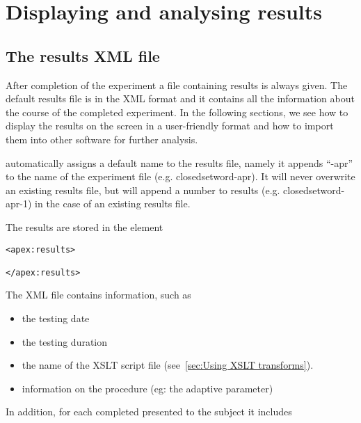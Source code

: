 \chapter{Displaying and analysing results}
\label{chap:Results}
\section{The results XML file}

After completion of the experiment a file containing results is
always given. The default results file is in the XML format and it
contains all the information about the course of the completed
experiment. In the following sections, we see how to display the
results on the screen in a user-friendly format and how to import
them into other software for further analysis.

\apex automatically assigns a default name to the results file,
namely it appends ``-apr'' to the name of the experiment file
(e.g. closedsetword-apr). It will never overwrite an existing
results file, but will append a number to results (e.g.
closedsetword-apr-1) in the case of an existing results file.

The results are stored in the element
\begin{lstlisting}
<apex:results>

</apex:results>
\end{lstlisting}

The XML file contains  information, such as

\begin{itemize}
\item the testing date

\item the testing duration

\item the name of the XSLT script file (see~\ref{sec:Using XSLT
transforms}).

\item information on the procedure (eg: the adaptive parameter)

\end{itemize}

In addition, for each completed  presented to the
subject it includes

